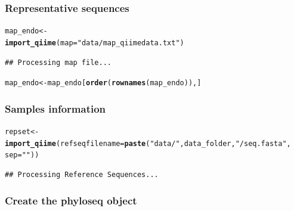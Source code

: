 \documentclass[12pt]{article}\usepackage[]{graphicx}\usepackage[]{color}
\makeatletter
\newcommand{\hlstr}[1]{\textcolor[rgb]{0.192,0.494,0.8}{#1}}%
\newcommand{\hlstd}[1]{\textcolor[rgb]{0.345,0.345,0.345}{#1}}%
\newcommand{\hlkwb}[1]{\textcolor[rgb]{0.69,0.353,0.396}{#1}}%
\newcommand{\hlkwc}[1]{\textcolor[rgb]{0.333,0.667,0.333}{#1}}%
\newcommand{\hlkwd}[1]{\textcolor[rgb]{0.737,0.353,0.396}{\textbf{#1}}}%
\newenvironment{kframe}{%
 \def\at@end@of@kframe{}%
 \ifinner\ifhmode%
  \def\at@end@of@kframe{\end{minipage}}%
  \begin{minipage}{\columnwidth}%
 \fi\fi%
 \def\FrameCommand##1{\hskip\@totalleftmargin \hskip-\fboxsep
 \colorbox{shadecolor}{##1}\hskip-\fboxsep
     \hskip-\linewidth \hskip-\@totalleftmargin \hskip\columnwidth}%
 \MakeFramed {\advance\hsize-\width
   \@totalleftmargin\z@ \linewidth\hsize
   \@setminipage}}%
 {\par\unskip\endMakeFramed%
 \at@end@of@kframe}
\newenvironment{knitrout}{}{} %
\numberwithin{figure}{section}
\makeatother
\begin{document}
 \subsubsection{Representative sequences}
\begin{knitrout}\small
{}\color{fgcolor}\begin{kframe}
\begin{alltt}
\hlstd{map_endo} \hlkwb{<-}
  \hlkwd{import_qiime}\hlstd{(}\hlkwc{map} \hlstd{=} \hlstr{"data/map_qiimedata.txt"}\hlstd{)}
\end{alltt}
\begin{verbatim}
## Processing map file...
\end{verbatim}
\begin{alltt}
\hlstd{map_endo} \hlkwb{<-} \hlstd{map_endo[}\hlkwd{order}\hlstd{(}\hlkwd{rownames}\hlstd{(map_endo)),]}
\end{alltt}
\end{kframe}
\end{knitrout}

 \subsubsection{Samples information}
\begin{knitrout}\small
{}\color{fgcolor}\begin{kframe}
\begin{alltt}
\hlstd{repset} \hlkwb{<-} \hlkwd{import_qiime}\hlstd{(}\hlkwc{refseqfilename} \hlstd{=} \hlkwd{paste}\hlstd{(}\hlstr{"data/"}\hlstd{, data_folder,} \hlstr{"/seq.fasta"}\hlstd{,}
                                              \hlkwc{sep} \hlstd{=} \hlstr{""}\hlstd{))}
\end{alltt}
\begin{verbatim}
## Processing Reference Sequences...
\end{verbatim}
\end{kframe}
\end{knitrout}

 \subsubsection{Create the phyloseq object}
\end{document}
